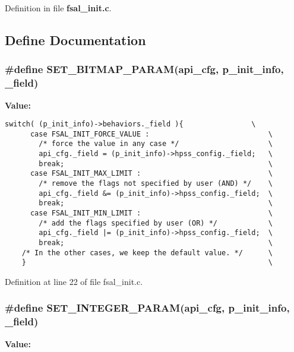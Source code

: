 Definition in file {\bf fsal\_\-init.c}.

\subsection{Define Documentation}
\subsubsection{\setlength{\rightskip}{0pt plus 5cm}\#define SET\_\-BITMAP\_\-PARAM(api\_\-cfg, p\_\-init\_\-info, \_\-field)}\label{fsal__init_8c_a0}


{\bf Value:}

\footnotesize\begin{verbatim}switch( (p_init_info)->behaviors._field ){                \
      case FSAL_INIT_FORCE_VALUE :                            \
        /* force the value in any case */                     \
        api_cfg._field = (p_init_info)->hpss_config._field;   \
        break;                                                \
      case FSAL_INIT_MAX_LIMIT :                              \
        /* remove the flags not specified by user (AND) */    \
        api_cfg._field &= (p_init_info)->hpss_config._field;  \
        break;                                                \
      case FSAL_INIT_MIN_LIMIT :                              \
        /* add the flags specified by user (OR) */            \
        api_cfg._field |= (p_init_info)->hpss_config._field;  \
        break;                                                \
    /* In the other cases, we keep the default value. */      \
    }                                                         \
\end{verbatim}\normalsize 


Definition at line 22 of file fsal\_\-init.c.
\subsubsection{\setlength{\rightskip}{0pt plus 5cm}\#define SET\_\-INTEGER\_\-PARAM(api\_\-cfg, p\_\-init\_\-info, \_\-field)}\label{fsal__init_8c_a1}


{\bf Value:}


